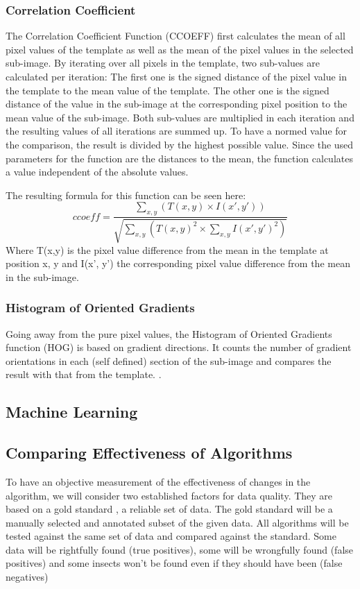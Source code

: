 \subsubsection{Correlation Coefficient}
The Correlation Coefficient Function (CCOEFF) first calculates the mean of all pixel values of the template as well as the mean of the pixel values in the selected sub-image.
By iterating over all pixels in the template, two sub-values are calculated per iteration:
The first one is the signed distance of the pixel value in the template to the mean value of the template.
The other one is the signed distance of the value in the sub-image at the corresponding pixel position to the mean value of the sub-image.
Both sub-values are multiplied in each iteration and the resulting values of all iterations are summed up.
To have a normed value for the comparison, the result is divided by the highest possible value.
Since the used parameters for the function are the distances to the mean, the function calculates a value independent of the absolute values.

The resulting formula for this function can be seen here:
\[ccoeff = \frac{\sum_{x,y} (T(x,y) \times I(x',y'))}{\sqrt{\sum_{x,y} (T(x,y)^2 \times \sum_{x,y} I(x',y')^2)}} \]
Where T(x,y) is the pixel value difference from the mean in the template at position x, y and I(x', y') the corresponding pixel value difference from the mean in the sub-image.

\subsubsection{Histogram of Oriented Gradients}
Going away from the pure pixel values, the Histogram of Oriented Gradients function (HOG) is based on gradient directions.
It counts the number of gradient orientations in each (self defined) section of the sub-image and compares the result with that from the template.
\cite{hog_function}.

\subsection{Machine Learning}

\subsection{Comparing Effectiveness of Algorithms}
To have an objective measurement of the effectiveness of changes in the algorithm, we will consider two established factors for data quality.
They are based on a gold standard \cite{gold_standard}, a reliable set of data.
The gold standard will be a manually selected and annotated subset of the given data. 
All algorithms will be tested against the same set of data and compared against the standard.
Some data will be rightfully found (true positives), some will be wrongfully found (false positives) and some insects won't be found even if they should have been (false negatives)

